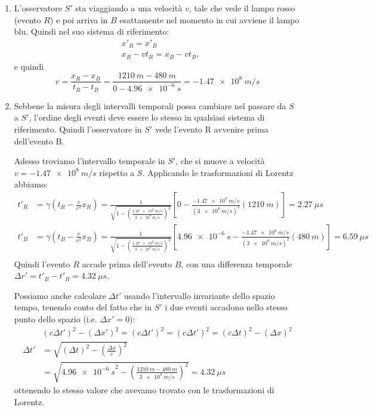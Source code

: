 \documentclass{article}
\begin{document}
\begin{Answer}
  \begin{enumerate}
    \item L'osservatore $S'$ sta viaggiando a una velocit\`a $v$, tale che vede il lampo rosso (evento $R$) e
      poi arriva in $B$ esattamente nel momento in cui avviene il lampo blu. Quindi nel suo sistema di riferimento:
      \begin{align*}
        &x'_R = x'_B \\
        &x_R - vt_R = x_B - vt_B,
      \end{align*}
      e quindi
      \begin{equation*}
        v = \frac{x_R - x_B}{t_R-t_B} =
        \frac{\SI{1210}{m} - \SI{480}{m}}{0-\SI{4.96e-6}{s}} =
        \SI{-1.47e8}{m/s}
      \end{equation*}

    \item Sebbene la misura degli intervalli temporali possa cambiare
      nel passare da $S$ a $S'$, l'ordine degli eventi deve essere lo
      stesso in qualsiasi sistema di riferimento. Quindi l'osservatore in $S'$ vede l'evento R avvenire prima dell'evento B.

      Adesso troviamo l'intervallo temporale in $S'$, che si muove a
      velocit\`a $v=\SI{-1.47e8}{m/s}$ rispetto a $S$. Applicando le
      trasformazioni di Lorentz abbiamo:
      \begin{align*}
        t'_R &= \gamma\left(t_R-\frac{v}{c^2}x_R\right) = \frac{1}{\sqrt{1-\left(\frac{\SI{1.47e8}{m/s}}{\SI{3e8}{m/s}}\right)^2}}
        \left[0-\frac{\SI{-1.47e8}{m/s}}{(\SI{3e8}{m/s})^2}(\SI{1210}{m})\right]=\SI{2.27}{\mu s} \\
        t'_B &= \gamma\left(t_B-\frac{v}{c^2}x_B\right) = \frac{1}{\sqrt{1-\left(\frac{\SI{1.47e8}{m/s}}{\SI{3e8}{m/s}}\right)^2}}
        \left[\SI{4.96e-6}{s}-\frac{\SI{-1.47e8}{m/s}}{(\SI{3e8}{m/s})^2}(\SI{480}{m})\right]=\SI{6.59}{\mu s} \\
      \end{align*}
      Quindi l'evento $R$ accade prima dell'evento $B$, con una
      differenza temporale $\Delta r'= t'_B-t'_R=\SI{4.32}{\mu s}$.

      Possiamo anche calcolare $\Delta t'$ usando l'intervallo
      invariante dello spazio tempo, tenendo conto del fatto che in
      $S'$ i due eventi accadono nello stesso punto dello spazio
      (i.e. $\Delta x'=0$):
      \begin{align*}
        &(c\Delta t')^2-(\Delta x')^2 = (c\Delta t')^2 = (c\Delta t')^2 = (c\Delta t)^2-(\Delta x)^2 \\
        \Delta t' &= \sqrt{(\Delta t)^2-\left(\frac{\Delta x}{c}\right)^2} \\
        & = \sqrt{ \SI{4.96e-6}{s}^2 - \left( \frac{\SI{1210}{m}-\SI{480}{m}}{\SI{3e8}{m/s}} \right)^2} = \SI{4.32}{\mu s}
      \end{align*}
      ottenendo lo stesso valore che avevamo trovato con le trasformazioni di Lorentz.
  \end{enumerate}
\end{Answer}
\end{document}
